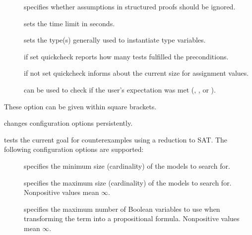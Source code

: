 \begin{isabellebody}
\begin{isamarkuptext}
\begin{description}
\begin{description}
    \item[] specifies whether assumptions in
    structured proofs should be ignored.

    \item[] sets the time limit in seconds.

    \item[] sets the type(s) generally used to
    instantiate type variables.

    \item[] if set quickcheck reports how many tests
    fulfilled the preconditions.

    \item[] if not set quickcheck informs about the
    current size for assignment values.

    \item[] can be used to check if the user's
    expectation was met (, , or ).

    \end{description}

    These option can be given within square brackets.

  \item \hyperlink{command.HOL.quickcheck-params}{\mbox{}} changes
    \hyperlink{command.HOL.quickcheck}{\mbox{}} configuration options persistently.

  \item \hyperlink{command.HOL.refute}{\mbox{}} tests the current goal for
    counterexamples using a reduction to SAT. The following configuration
    options are supported:

    \begin{description}

    \item[] specifies the minimum size (cardinality) of the
      models to search for.

    \item[] specifies the maximum size (cardinality) of the
      models to search for. Nonpositive values mean $\infty$.

    \item[] specifies the maximum number of Boolean variables
    to use when transforming the term into a propositional formula.
    Nonpositive values mean $\infty$.


\end{description}
\end{description}
\end{isamarkuptext}
\end{isabellebody}
